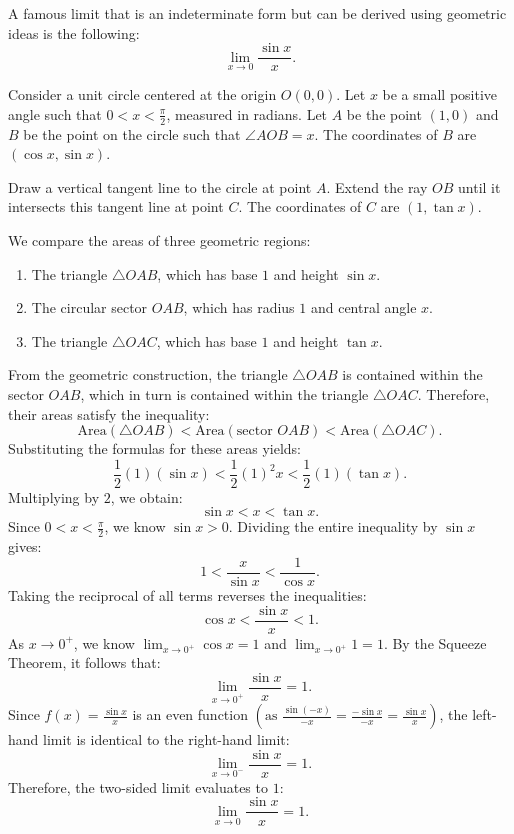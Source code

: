 \documentclass[../calculus.tex]{subfiles}
\begin{document}
\begin{example}

A famous limit that is an indeterminate form but can be derived using geometric ideas is the following:
\[\lim_{x\to 0}\frac{\sin x}{x}.\]

Consider a unit circle centered at the origin $O(0,0)$. Let $x$ be a small positive angle such that $0 < x < \frac{\pi}{2}$, measured in radians. Let $A$ be the point $(1,0)$ and $B$ be the point on the circle such that $\angle AOB = x$. The coordinates of $B$ are $(\cos x, \sin x)$.

Draw a vertical tangent line to the circle at point $A$. Extend the ray $OB$ until it intersects this tangent line at point $C$. The coordinates of $C$ are $(1, \tan x)$.

We compare the areas of three geometric regions:
\begin{enumerate}
    \item The triangle $\triangle OAB$, which has base $1$ and height $\sin x$.
    \item The circular sector $OAB$, which has radius $1$ and central angle $x$.
    \item The triangle $\triangle OAC$, which has base $1$ and height $\tan x$.
\end{enumerate}

From the geometric construction, the triangle $\triangle OAB$ is contained within the sector $OAB$, which in turn is contained within the triangle $\triangle OAC$. Therefore, their areas satisfy the inequality:
$$
\text{Area}(\triangle OAB) < \text{Area}(\text{sector } OAB) < \text{Area}(\triangle OAC).
$$
Substituting the formulas for these areas yields:
$$
\frac{1}{2}(1)(\sin x) < \frac{1}{2}(1)^2 x < \frac{1}{2}(1)(\tan x).
$$
Multiplying by $2$, we obtain:
$$
\sin x < x < \tan x.
$$
Since $0 < x < \frac{\pi}{2}$, we know $\sin x > 0$. Dividing the entire inequality by $\sin x$ gives:
$$
1 < \frac{x}{\sin x} < \frac{1}{\cos x}.
$$
Taking the reciprocal of all terms reverses the inequalities:
$$
\cos x < \frac{\sin x}{x} < 1.
$$
As $x \to 0^+$, we know $\lim_{x \to 0^+} \cos x = 1$ and $\lim_{x \to 0^+} 1 = 1$. By the Squeeze Theorem, it follows that:
$$
\lim_{x \to 0^+} \frac{\sin x}{x} = 1.
$$
Since $f(x) = \frac{\sin x}{x}$ is an even function $\left(\text{as } \frac{\sin(-x)}{-x} = \frac{-\sin x}{-x} = \frac{\sin x}{x}\right)$, the left-hand limit is identical to the right-hand limit:
$$
\lim_{x \to 0^-} \frac{\sin x}{x} = 1.
$$
Therefore, the two-sided limit evaluates to $1$:
$$
\lim_{x \to 0} \frac{\sin x}{x} = 1. 
$$
\end{example}
\end{document}
